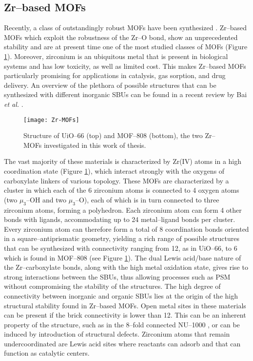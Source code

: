 \subsection*{Zr--based MOFs}
Recently, a class of outstandingly robust MOFs have been synthesized \cite{furukawa2014water}. Zr--based MOFs\cite{bai2016zr} which exploit the robustness of the Zr--O bond, show an unprecedented stability and are at present time one of the most studied classes of MOFs (Figure \ref{fig:Zr-MOFs}). Moreover, zirconium is an ubiquitous metal that is present in biological systems and has low toxicity, as well as limited cost. This makes Zr--based MOFs particularly promising for applications in catalysis, gas sorption, and drug delivery. An overview of the plethora of possible structures that can be synthesized with different inorganic SBUs can be found in a recent review by Bai \textit{et al.} \cite{bai2016zr}.
\npar
\begin{figure}[!htbp]
	\centering
 	\texttt{[image: Zr-MOFs]}
	\caption{Structure of UiO--66 (top) and MOF--808 (bottom), the two Zr--MOFs investigated in this work of thesis.}
	\label{fig:Zr-MOFs}
\end{figure}
The vast majority of these materials is characterized by Zr(IV) atoms in a high coordination state (Figure \ref{fig:Zr-MOFs}), which interact strongly with the oxygens of carboxylate linkers of various topology. These MOFs are characterized by a  cluster in which each of the 6 zirconium atoms is connected to 4 oxygen atoms (two $\mu_3$--OH and two $\mu_3$--O), each of which is in turn connected to three zirconium atoms, forming a polyhedron. Each zirconium atom can form 4 other bonds with ligands, accommodating up to 24 metal--ligand bonds per cluster. Every zirconium atom can therefore form a total of 8 coordination bonds oriented in a square--antiprismatic geometry, yielding a rich range of possible structures that can be synthesized with connectivity ranging from 12, as in UiO--66\cite{cavka2008new}, to 6 which is found in MOF--808\cite{furukawa2014water} (see Figure \ref{fig:Zr-MOFs}). The dual Lewis acid/base nature of the Zr--carboxylate bonds, along with the high metal oxidation state, gives rise to strong interactions between the SBUs, thus allowing processes such as PSM without compromising the stability of the structures. The high degree of connectivity between inorganic and organic SBUs lies at the origin of the high structural stability found in Zr--based MOFs\cite{bai2016zr, leus2016systematic}. Open metal sites in these materials can be present if the brick connectivity is lower than 12. This can be an inherent property of the structure, such as in the 8--fold connected NU--1000 \cite{mondloch2013vapor}, or can be induced by introduction of structural defects. Zirconium atoms that remain undercoordinated are Lewis acid sites where reactants can adsorb and that can function as catalytic centers.

